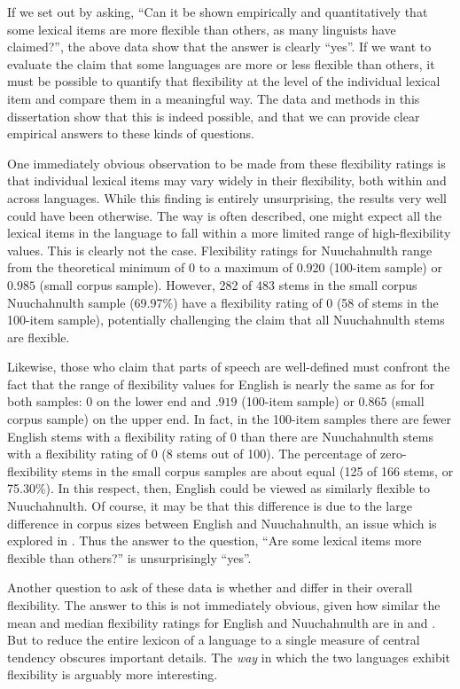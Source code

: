 If we set out by asking, \enquote{Can it be shown empirically and quantitatively that some lexical items are more flexible than others, as many linguists have claimed?}, the above data show that the answer is clearly \enquote{yes}. If we want to evaluate the claim that some languages are more or less flexible than others, it must be possible to quantify that flexibility at the level of the individual lexical item and compare them in a meaningful way. The data and methods in this dissertation show that this is indeed possible, and that we can provide clear empirical answers to these kinds of questions.

One immediately obvious observation to be made from these flexibility ratings is that individual lexical items may vary widely in their flexibility, both within and across languages. While this finding is entirely unsurprising, the results very well could have been otherwise. The way  is often described, one might expect all the lexical items in the language to fall within a more limited range of high-flexibility values. This is clearly not the case. Flexibility ratings for Nuuchahnulth range from the theoretical minimum of $0$ to a maximum of $0.920$ (100-item sample) or $0.985$ (small corpus sample). However, 282 of 483 stems in the small corpus Nuuchahnulth sample (69.97\%) have a flexibility rating of $0$ (58 of stems in the 100-item sample), potentially challenging the claim that all Nuuchahnulth stems are flexible.

Likewise, those who claim that  parts of speech are well-defined must confront the fact that the range of flexibility values for English is nearly the same as for  for both samples: $0$ on the lower end and $.919$ (100-item sample) or $0.865$ (small corpus sample) on the upper end. In fact, in the 100-item samples there are fewer English stems with a flexibility rating of $0$ than there are Nuuchahnulth stems with a flexibility rating of $0$ (8 stems out of 100). The percentage of zero-flexibility stems in the small corpus samples are about equal (125 of 166 stems, or 75.30\%). In this respect, then, English could be viewed as similarly flexible to Nuuchahnulth. Of course, it may be that this difference is due to the large difference in corpus sizes between English and Nuuchahnulth, an issue which is explored in . Thus the answer to the question, \enquote{Are some lexical items more flexible than others?} is unsurprisingly \enquote{yes}.

Another question to ask of these data is whether  and  differ in their overall flexibility. The answer to this is not immediately obvious, given how similar the mean and median flexibility ratings for English and Nuuchahnulth are in  and . But to reduce the entire lexicon of a language to a single measure of central tendency obscures important details. The \emph{way} in which the two languages exhibit flexibility is arguably more interesting.

